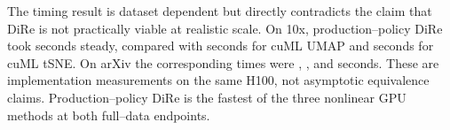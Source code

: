 \documentclass[11pt]{article}
\begin{document}
\begin{table}[tbp]
  \centering
  \small
  \resizebox{\textwidth}{!}{%
    }
  \caption{Public large--data inputs. Here $N$ is the full number of
  observations and $D$ is the common input dimension supplied to every
  reducer.}
  \label{tab:revision3-datasets}
\end{table}

The timing result is dataset dependent but directly contradicts the claim that
DiRe is not practically viable at realistic scale. On 10x,
production--policy DiRe took \TenxDireAutoSteadySeconds{} seconds steady,
compared with \TenxCumlUmapSteadySeconds{} seconds for cuML UMAP and
\TenxCumlTsneSteadySeconds{} seconds for cuML tSNE. On arXiv the corresponding
times were \ArxivDireAutoSteadySeconds{},
\ArxivCumlUmapSteadySeconds{}, and
\ArxivCumlTsneSteadySeconds{} seconds. These are implementation measurements
on the same H100, not asymptotic equivalence claims. Production--policy DiRe
is the fastest of the three nonlinear GPU methods at both full--data
endpoints.
\end{document}

